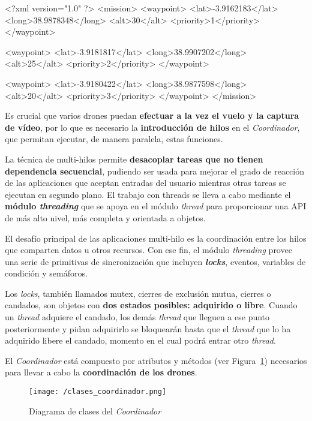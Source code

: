 \begin{listing}[
 float=,
 language = XML,
 caption = {Ejemplo de archivo XML que contiene la información de los «waypoints»},
 label  = code:archivoxml]
<?xml version="1.0" ?>
<mission>
	<waypoint>
 		<lat>-3.9162183</lat>
 		<long>38.9878348</long>
		<alt>30</alt>
		<priority>1</priority>
	</waypoint>

	<waypoint>
 		<lat>-3.9181817</lat>
 		<long>38.9907202</long>
		<alt>25</alt>
		<priority>2</priority>
	</waypoint>

	<waypoint>
 		<lat>-3.9180422</lat>
 		<long>38.9877598</long>
		<alt>20</alt>
		<priority>3</priority>
	</waypoint>
</mission>
\end{listing}


Es crucial que varios drones puedan \textbf{efectuar a la vez el vuelo y la captura de vídeo}, por lo que es necesario la \textbf{introducción de hilos} en el \textit{Coordinador}, que permitan ejecutar, de manera paralela, estas funciones. 

La técnica de multi-hilos permite \textbf{desacoplar tareas que no tienen dependencia secuencial}, pudiendo ser usada para mejorar el grado de reacción de las aplicaciones que aceptan entradas del usuario mientras otras tareas se ejecutan en segundo plano. El trabajo con threads se lleva a cabo mediante el \textbf{módulo \textit{threading}} que se apoya en el módulo \textit{thread} para proporcionar una \acs{API} de más alto nivel, más completa y orientada a objetos. 

El desafío principal de las aplicaciones multi-hilo es la coordinación entre los hilos que comparten datos u otros recursos. Con ese fin, el módulo \textit{threading} provee una serie de primitivas de sincronización que incluyen \textbf{\textit{locks}}, eventos, variables de condición y semáforos. 

Los \textit{locks}, también llamados mutex, cierres de exclusión mutua, cierres o candados, son objetos con \textbf{dos estados posibles: adquirido o libre}. Cuando un \textit{thread} adquiere el candado, los demás \textit{thread} que lleguen a ese punto posteriormente y pidan adquirirlo se bloquearán hasta que el \textit{thread} que lo ha adquirido libere el candado, momento en el cual podrá entrar otro \textit{thread}.

El \textit{Coordinador} está compuesto por atributos y métodos (ver Figura~\ref{fig:diagclasescoord}) necesarios para llevar a cabo la \textbf{coordinación de los drones}.

\begin{figure}[!h]
\begin{center}
\texttt{[image: /clases\_coordinador.png]}
\caption[Diagrama de clases del \textit{Coordinador}]{Diagrama de clases del \textit{Coordinador}}
\label{fig:diagclasescoord}
\end{center}
\end{figure}

